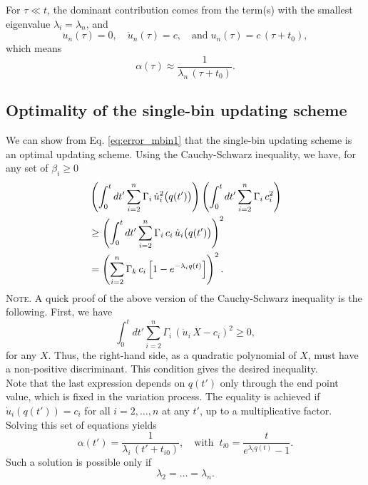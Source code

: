 \documentclass[reprint]{revtex4-1}
\newcommand{\note}[1]{{\color{DarkGreen}\footnotesize \textsc{Note.} #1}}
\begin{document}
%
%
For $\tau \ll t$,
the dominant contribution comes from
the term(s) with the smallest eigenvalue $\lambda_i = \lambda_n$,
and
$$
\ddot u_n(\tau) = 0,
\quad
\dot u_n(\tau) = c,
\quad
\mathrm{and}\;
u_n(\tau) = c \, (\tau + t_0),
$$
which means
$$
\alpha(\tau) \approx \frac{1}{\lambda_n \, (\tau + t_0)}.
$$



\subsection{\label{sec:optWL}
Optimality of the single-bin updating scheme}



We can show from Eq. \eqref{eq:error_mbin1}
that the single-bin updating scheme
is an optimal updating scheme.
%
Using the Cauchy-Schwarz inequality, we have,
for any set of $\beta_i \ge 0$
%
\begin{align}
&
\left( \int_0^t
  dt' \sum_{i = 2}^n \Gamma_i \,
                     \dot u_i^2\bigl( q(t') \bigr)
\right)
\left(
\int_0^t
  dt' \sum_{i = 2}^n \Gamma_i \, c_i^2
\right)
\notag
\\
&
\ge
\left(
\int_0^t
  dt' \sum_{i = 2}^n \Gamma_i \, c_i \,
                     \dot u_i\bigl( q(t') \bigr)
\right)^2
\notag
\\
&
=
\left(
  \sum_{i = 2}^n \Gamma_k \, c_i
    \left[
      1 - e^{ -\lambda_i q(t) }
    \right]
\right)^2.
\notag
\end{align}
%
\note{A quick proof of the above version
  of the Cauchy-Schwarz inequality
  is the following.
  First, we have
$$
\int_0^t
  dt' \sum_{i = 2}^n \Gamma_i \,
    \left( \dot u_i \, X - c_i \right)^2
\ge 0,
$$
  for any $X$.
  Thus, the right-hand side,
  as a quadratic polynomial of $X$,
  must have a non-positive discriminant.
  This condition gives the desired inequality.
  \\%
}
%
Note that the last expression depends on
$q(t')$ only through the end point value,
which is fixed in the variation process.
%
The equality is achieved
if $\dot u_i\left( q(t') \right) = c_i$
for all $i = 2, \dots, n$ at any $t'$,
up to a multiplicative factor.
%
Solving this set of equations yields
$$
\alpha(t') = \frac{              1              }
                  { \lambda_i \, (t' + t_{i0} ) },
\quad
\mathrm{with\;\;}
t_{i0} = \frac{             t            }
              { e^{ \lambda_i q(t) } - 1 }.
$$
Such a solution is possible only if
\begin{equation}
\lambda_2 = \dots = \lambda_n.
\end{equation}
\end{document}
